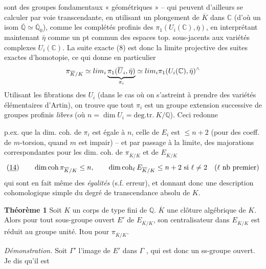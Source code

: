 \documentclass[11pt,a4paper]{article}
\begin{document}
sont des groupes fondamentaux « géométriques » -- qui peuvent d'ailleurs se calculer par voie transcendante, en utilisant un plongement de $\overline{K}$ dans $\mathbb{C}$ (d'où un isom $\overline{\mathbb{Q}} \simeq \overline{\mathbb{Q}}_0$), comme les complétés profinis des $\pi_1(U_i(\mathbb{C}), \bar\eta)$, en interprétant maintenant $\bar\eta$ comme un pt  commun des espaces top. sous-jacents aux variétés complexes $U_i(\mathbb{C})$. La suite exacte (8) est donc la limite projective des suites exactes d'homotopie, ce qui donne en particulier
\[
  \pi_{\overline{K}/K} \simeq \varprojlim_i \underbrace{\pi_1(\overline{U}_i, \bar\eta)}_{\pi_i}
  \simeq \varprojlim_i \pi_1(U_i(\mathbb{C}), \bar\eta)^{\wedge}
\]
Utilisant les fibrations des $U_i$ (dans le cas où on s'astreint à prendre des variétés élémentaires d'Artin), on trouve que tout $\pi_i$ est un groupe  extension successive de  groupes profinis \emph{libres} (où $n = \dim U_i = \text{deg.tr.}\ K/\mathbb{Q}$). Ceci redonne

p.ex. que la dim. coh. de $\pi_i$ est égale à $n$, celle de $E_i$ est $\leq n+2$ (pour des coeff. \struck{\ill{}} de $m$-torsion, quand $m$ est impair) -- et par passage à la limite, des majorations correspondantes pour les dim. coh. de $\pi_{\overline{K}/K}$ et de $E_{\overline{K}/K}$
\[
  (\uncertain{14})\qquad \operatorname{dim\,coh} \pi_{\overline{K}/K} \leq n, \qquad
  \operatorname{dim\,coh}_\ell E_{\overline{K}/K} \leq n+2 \ \text{si}\ \ell \neq 2
  \quad (\ell\ \text{nb premier})
\]
qui sont en fait même des \emph{égalités} (s.f. erreur), et donnant donc une description cohomologique simple du degré de transcendance absolu de $K$.

\textbf{Théorème 1} Soit $K$ un corps  de type fini de $\mathbb{Q}$.  $\overline{K}$ une clôture algébrique de $K$. Alors pour tout sous-groupe ouvert $E'$ de $E_{\overline{K}/K}$, son centralisateur dans $E_{\overline{K}/K}$ est réduit au groupe unité. Itou pour $\pi_{\overline{K}/K}$.

\emph{Démonstration.} Soit \struck{\ill{}} $\Gamma'$  l'image de $E'$ dans $\Gamma$ , qui est donc un ss-groupe ouvert.     Je dis qu'il est
\end{document}
